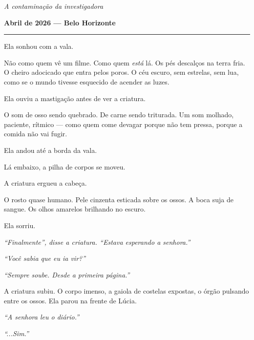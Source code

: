 
\noindent \textit{A contaminação da investigadora}

\noindent \textbf{Abril de 2026 --- Belo Horizonte}

\vspace{0.5em}\noindent\rule{\textwidth}{0.5pt}\vspace{0.5em}

\noindent Ela sonhou com a vala.

\noindent Não como quem vê um filme. Como quem \textit{está} lá. Os pés descalços na terra fria. O cheiro adocicado que entra pelos poros. O céu escuro, sem estrelas, sem lua, como se o mundo tivesse esquecido de acender as luzes.

\noindent Ela ouviu a mastigação antes de ver a criatura.

\noindent O som de osso sendo quebrado. De carne sendo triturada. Um som molhado, paciente, rítmico --- como quem come devagar porque não tem pressa, porque a comida não vai fugir.

\noindent Ela andou até a borda da vala.

\noindent Lá embaixo, a pilha de corpos se moveu.

\noindent A criatura ergueu a cabeça.

\noindent O rosto quase humano. Pele cinzenta esticada sobre os ossos. A boca suja de sangue. Os olhos amarelos brilhando no escuro.

\noindent Ela sorriu.

\noindent \textit{\textquotedblleft{}Finalmente\textquotedblright{}\textit{, disse a criatura. }\textquotedblleft{}Estava esperando a senhora.\textquotedblright{}}

\noindent \textit{\textquotedblleft{}Você sabia que eu ia vir?\textquotedblright{}}

\noindent \textit{\textquotedblleft{}Sempre soube. Desde a primeira página.\textquotedblright{}}

\noindent A criatura subiu. O corpo imenso, a gaiola de costelas expostas, o órgão pulsando entre os ossos. Ela parou na frente de Lúcia.

\noindent \textit{\textquotedblleft{}A senhora leu o diário.\textquotedblright{}}

\noindent \textit{\textquotedblleft{}...Sim.\textquotedblright{}}

